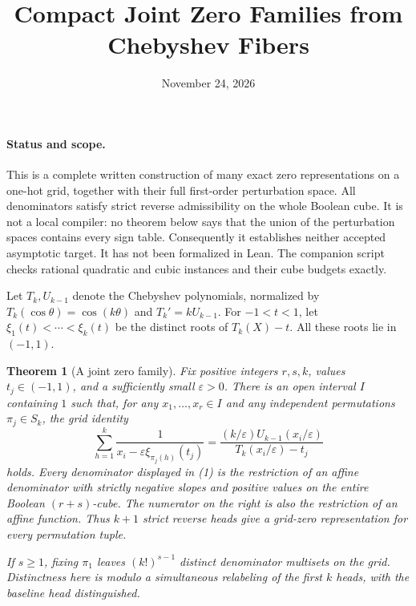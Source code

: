 \documentclass[11pt]{article}
\title{Compact Joint Zero Families from Chebyshev Fibers}
\author{}
\date{November 24, 2026}
\newtheorem{theorem}{Theorem}
\begin{document}
\maketitle

\paragraph{Status and scope.}
This is a complete written construction of many exact zero representations
on a one-hot grid, together with their full first-order perturbation
space. All denominators satisfy strict reverse admissibility on the
whole Boolean cube. It is not a local compiler: no theorem below says
that the union of the perturbation spaces contains every sign table.
Consequently it establishes neither accepted asymptotic target. It has
not been formalized in Lean. The companion script checks rational
quadratic and cubic instances and their cube budgets exactly.

Let $T_k,U_{k-1}$ denote the Chebyshev polynomials, normalized by
$T_k(\cos\theta)=\cos(k\theta)$ and
$T_k'=kU_{k-1}$. For $-1<t<1$, let
$\xi_1(t)<\cdots<\xi_k(t)$ be the distinct roots of $T_k(X)-t$.
All these roots lie in $(-1,1)$.

\begin{theorem}[A joint zero family]
Fix positive integers $r,s,k$, values $t_j\in(-1,1)$, and a sufficiently
small $\varepsilon>0$. There is an open interval $I$ containing $1$
such that, for any $x_1,\ldots,x_r\in I$ and any independent
permutations $\pi_j\in S_k$, the grid identity
\[
 \sum_{h=1}^k\frac{1}{x_i-\varepsilon\xi_{\pi_j(h)}(t_j)}
 =\frac{(k/\varepsilon)U_{k-1}(x_i/\varepsilon)}
 {T_k(x_i/\varepsilon)-t_j}
 \tag{1}
\]
holds. Every denominator displayed in (1) is the restriction of an
affine denominator with strictly negative slopes and positive values
on the entire Boolean $(r+s)$-cube. The numerator on the right is
also the restriction of an affine function. Thus $k+1$ strict reverse
heads give a grid-zero representation for every permutation tuple.

If $s\geq1$, fixing $\pi_1$ leaves $(k!)^{s-1}$ distinct denominator
multisets on the grid. Distinctness here is modulo a simultaneous
relabeling of the first $k$ heads, with the baseline head distinguished.
\end{theorem}
\end{document}
